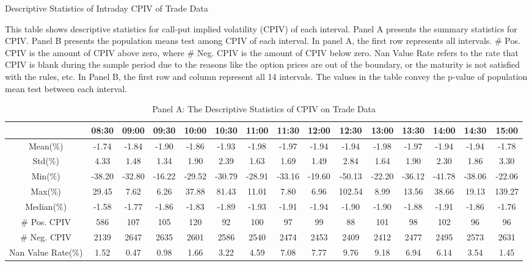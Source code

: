 \begin{table}[h]

\caption{Descriptive Statistics of Intraday CPIV of Trade Data}\label{table:stats_of_CPIV_2}
\begin{threeparttable}

\medskip

{\scriptsize 
This table shows descriptive statistics for call-put implied volatility (CPIV) of each interval. Panel A presents the summary statistics for CPIV. Panel B presents the population means test among CPIV of each interval. In panel A, the first row represents all intervals.  \# Pos. CPIV is the amount of CPIV above zero, where \# Neg. CPIV is the amount of CPIV below zero. Nan Value Rate refers to the rate that CPIV is blank during the sample period due to the reasons like the option prices are out of the boundary, or the maturity is not satisfied with the rules, etc. In Panel B, the first row and column represent all 14 intervals. The values in the table convey the p-value of population mean test between each interval. 
}
\medskip

\begin{subtable}[t]{\linewidth}

\caption{Panel A: The Descriptive Statistics of CPIV on Trade Data }
\tiny

\begin{tabular}{ccccccccccccccc}
\toprule

                   & 08:30  & 09:00  & 09:30  & 10:00  & 10:30  & 11:00  & 11:30  & 12:00  & 12:30  & 13:00  & 13:30  & 14:00  & 14:30  & 15:00  \\ \midrule	
Mean(\%)           & -1.74  & -1.84  & -1.90  & -1.86  & -1.93  & -1.98  & -1.97  & -1.94  & -1.94  & -1.98  & -1.97  & -1.94  & -1.94  & -1.78  \\
Std(\%)            & 4.33   & 1.48   & 1.34   & 1.90   & 2.39   & 1.63   & 1.69   & 1.49   & 2.84   & 1.64   & 1.90   & 2.30   & 1.86   & 3.30   \\
Min(\%)            & -38.20 & -32.80 & -16.22 & -29.52 & -30.79 & -28.91 & -33.16 & -19.60 & -50.13 & -22.20 & -36.12 & -41.78 & -38.06 & -22.06 \\
Max(\%)            & 29.45  & 7.62   & 6.26   & 37.88  & 81.43  & 11.01  & 7.80   & 6.96   & 102.54 & 8.99   & 13.56  & 38.66  & 19.13  & 139.27 \\
Median(\%)         & -1.58  & -1.77  & -1.86  & -1.83  & -1.89  & -1.93  & -1.91  & -1.94  & -1.90  & -1.90  & -1.88  & -1.91  & -1.86  & -1.76  \\
\# Pos. CPIV       & 586    & 107    & 105    & 120    & 92     & 100    & 97     & 99     & 88     & 101    & 98     & 102    & 96     & 96     \\
\# Neg. CPIV       & 2139   & 2647   & 2635   & 2601   & 2586   & 2540   & 2474   & 2453   & 2409   & 2412   & 2477   & 2495   & 2573   & 2631   \\
Nan Value Rate(\%) & 1.52   & 0.47   & 0.98   & 1.66   & 3.22   & 4.59   & 7.08   & 7.77   & 9.76   & 9.18   & 6.94   & 6.14   & 3.54   & 1.45 
\\
\bottomrule
\end{tabular}
\end{subtable}



\end{threeparttable}
\end{table}
